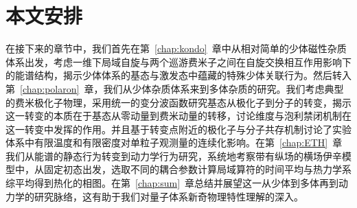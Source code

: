 \section{本文安排}\label{1sec:sum}
在接下来的章节中，我们首先在第~\ref{chap:kondo}~章中从相对简单的少体磁性杂质体系出发，考虑一维下局域自旋与两个巡游费米子之间在自旋交换相互作用影响下的能谱结构，揭示少体体系的基态与激发态中蕴藏的特殊少体关联行为。然后转入第~\ref{chap:polaron}~章，我们从少体杂质体系来到多体杂质的研究。我们考虑典型的费米极化子物理，采用统一的变分波函数研究基态从极化子到分子的转变，揭示这一转变的本质在于基态从零动量到费米动量的转移，讨论维度与泡利禁闭机制在这一转变中发挥的作用。并且基于转变点附近的极化子与分子共存机制讨论了实验体系中有限温度和有限密度对单粒子观测量的连续化影响。在第~\ref{chap:ETH}~章我们从能谱的静态行为转变到动力学行为研究，系统地考察带有纵场的横场伊辛模型中，从固定初态出发，选取不同的耦合参数计算局域算符的时间平均与热力学系综平均得到热化的相图。在第~\ref{chap:sum}~章总结并展望这一从少体到多体再到动力学的研究脉络，这有助于我们对量子体系新奇物理特性理解的深入。


